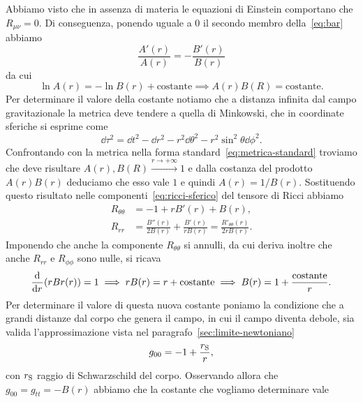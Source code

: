 Abbiamo visto che in assenza di materia le equazioni di Einstein comportano che
$R_{\mu\nu} = 0$.  Di conseguenza, ponendo uguale a $0$ il secondo membro
della~\eqref{eq:bar} abbiamo
\begin{equation}
  \frac{A'(r)}{A(r)} = -\frac{B'(r)}{B(r)}
\end{equation}
da cui
\begin{equation}
  \ln A(r) = - \ln B(r) + \text{costante} \implies A(r)B(R) = \text{costante}.
\end{equation}
Per determinare il valore della costante notiamo che a distanza infinita dal
campo gravitazionale la metrica deve tendere a quella di Minkowski, che in
coordinate sferiche si esprime come
\begin{equation}
  \dd\tau^{2} = \dd t^{2} -\dd r^{2} - r^{2}\dd\theta^{2} - r^{2}\sin^{2}\theta
  \dd\phi^{2}.
\end{equation}
Confrontando con la metrica nella forma standard~\eqref{eq:metrica-standard}
troviamo che deve risultare $A(r), B(R) \xrightarrow{r \to +\infty} 1$ e dalla
costanza del prodotto $A(r)B(r)$ deduciamo che esso vale $1$ e quindi
$A(r) = 1/B(r)$.  Sostituendo questo risultato nelle
componenti~\eqref{eq:ricci-sferico} del tensore di Ricci abbiamo
\begin{subequations}
  \begin{align}
    R_{\theta\theta} &= -1 + rB'(r) + B(r), \\
    R_{rr} &= \frac{B''(r)}{2B(r)} + \frac{B'(r)}{rB(r)} =
    \frac{R'_{\theta\theta}(r)}{2rB(r)}.
  \end{align}
\end{subequations}
Imponendo che anche la componente $R_{\theta\theta}$ si annulli, da cui deriva
inoltre che anche $R_{rr}$ e $R_{\phi\phi}$ sono nulle, si ricava
\begin{equation}
  \frac{{\mathop{}\!\mathrm{d}^{}}}{\mathop{}\!\mathrm{d} {r}^{}}(rBr(r)) = 1 \implies rB(r) = r + \text{costante} \implies B(r) = 1
  + \frac{\text{costante}}{r}.
\end{equation}
Per determinare il valore di questa nuova costante poniamo la condizione che a
grandi distanze dal corpo che genera il campo, in cui il campo diventa debole,
sia valida l'approssimazione vista nel paragrafo~\ref{sec:limite-newtoniano}
\begin{equation}
  g_{00} = -1 + \frac{r_{\textup{S}}}{r},
\end{equation}
con $r_{\textup{S}}$ raggio di Schwarzschild del corpo.  Osservando allora che
$g_{00} = g_{tt} = -B(r)$ abbiamo che la costante che vogliamo determinare vale
